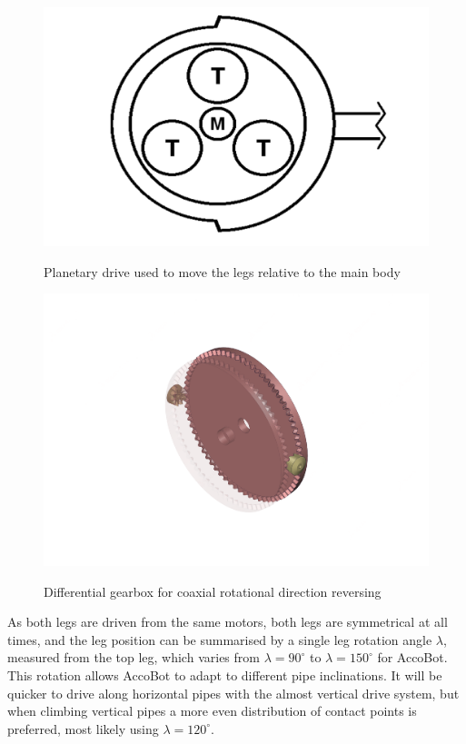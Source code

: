 \documentclass[11pt]{article}		%
\newlength{\imageheight}	 %
\begin{document}
				\begin{figure}[h]
					\centering
					\begin{multicols}{2}
						\includegraphics[height=\imageheight]{planetaryDrive}
						\caption{Planetary drive used to move the legs relative to the main body}
						\label{planetaryDrive}
						\columnbreak
						\includegraphics[height=\imageheight]{diffGearbox}
						\caption{Differential gearbox for coaxial rotational direction reversing}
						\label{diffGearbox}
					\end{multicols}
				\end{figure}
				
				As both legs are driven from the same motors, both legs are symmetrical at all times, and the leg position can be summarised by a single leg rotation angle $\lambda$, measured from the top leg, which varies from $\lambda = 90^\circ$ to $\lambda = 150^\circ$ for AccoBot.
				This rotation allows AccoBot to adapt to different pipe inclinations.
				It will be quicker to drive along horizontal pipes with the almost vertical drive system, but when climbing vertical pipes a more even distribution of contact points is preferred, most likely using $\lambda = 120^\circ$.
				
\end{document}
